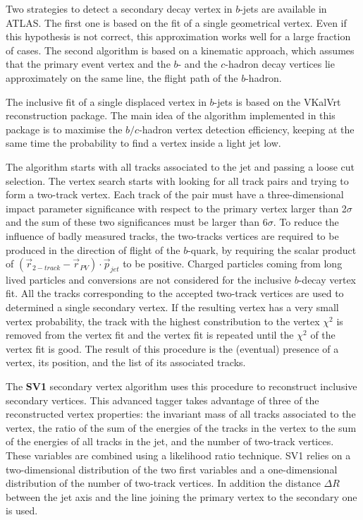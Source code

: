 Two strategies to detect a secondary decay vertex in $b$-jets are available in ATLAS. The first one is based on the fit of a single geometrical vertex. Even if this hypothesis is not correct, this approximation works well for a large fraction of cases.  The second algorithm is based on a kinematic approach, which assumes that the primary event vertex and the $b$- and the $c$-hadron decay vertices lie approximately on the same line, the flight path of the $b$-hadron. 

The inclusive fit of a single displaced vertex in $b$-jets is based on the VKalVrt~\cite{Kostyukhin:685551} reconstruction package. The main idea of the algorithm implemented in this package is to maximise the $b/c$-hadron vertex detection efficiency, keeping at the same time the probability to find a vertex inside a light jet low. 

The algorithm starts with all tracks associated to the jet and passing a loose cut selection. The vertex search starts with looking for all track pairs and trying to form a two-track vertex. Each track of the pair must have a three-dimensional impact parameter significance with respect to the primary vertex larger than 2$\sigma$ and the sum of these two significances must be larger than 6$\sigma$. To reduce the influence of badly measured tracks, the two-tracks vertices are required to be produced in the direction of flight of the $b$-quark, by requiring the scalar product of $(\vec{r}_{2-track} - \vec{r}_{PV})\cdot \vec{p}_{jet} $ to be positive. Charged particles coming from long lived particles and conversions are not considered for the inclusive $b$-decay vertex fit. All the tracks corresponding to the accepted two-track vertices are used to determined a single secondary vertex.  If the resulting vertex has a very small vertex probability, the track with the highest constribution to the vertex $\chi^2$  is removed from the vertex fit and the vertex fit is repeated until the $\chi^2$ of the vertex fit is good. The result of this procedure is the (eventual) presence of a vertex, its position, and the list of its associated tracks.

The \textbf{SV1} secondary vertex algorithm uses this procedure to reconstruct inclusive secondary vertices. This advanced tagger takes advantage of three of the reconstructed vertex properties: the invariant mass of all tracks associated to the vertex, the ratio of the sum of the energies of the tracks in the vertex to the sum of the energies of all tracks in the jet, and the number of two-track vertices. These variables are combined using a likelihood ratio technique. SV1 relies on a two-dimensional distribution of the two first variables and a one-dimensional distribution of the number of two-track vertices. In addition the distance $\Delta R$ between the jet axis and the line joining the primary vertex to the secondary one is used. 

